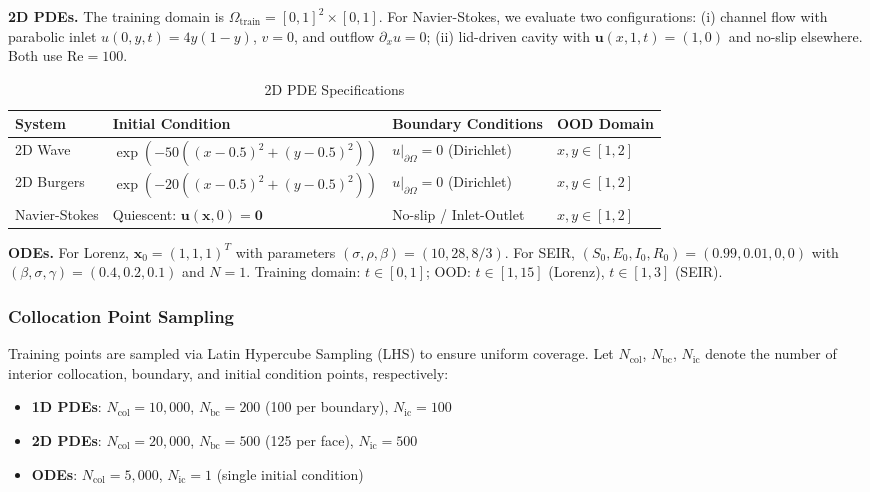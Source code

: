 \documentclass{article}
\theoremstyle{remark}
\begin{document}
\textbf{2D PDEs.} The training domain is $\Omega_{\text{train}} = [0,1]^2 \times [0,1]$. For Navier-Stokes, we evaluate two configurations: (i) channel flow with parabolic inlet $u(0,y,t) = 4y(1-y)$, $v=0$, and outflow $\partial_x u = 0$; (ii) lid-driven cavity with $\mathbf{u}(x,1,t) = (1,0)$ and no-slip elsewhere. Both use $\text{Re} = 100$.

\begin{table}[H]
\centering
\caption{2D PDE Specifications}
\label{tab:reproduction_2d}
\footnotesize
\begin{tabular}{llll}
\toprule
\textbf{System} & \textbf{Initial Condition} & \textbf{Boundary Conditions} & \textbf{OOD Domain} \\
\midrule
2D Wave & $\exp(-50((x-0.5)^2+(y-0.5)^2))$ & $u|_{\partial\Omega} = 0$ (Dirichlet) & $x,y \in [1,2]$ \\
2D Burgers & $\exp(-20((x-0.5)^2+(y-0.5)^2))$ & $u|_{\partial\Omega} = 0$ (Dirichlet) & $x,y \in [1,2]$ \\
Navier-Stokes & Quiescent: $\mathbf{u}(\mathbf{x},0) = \mathbf{0}$ & No-slip / Inlet-Outlet & $x,y \in [1,2]$ \\
\bottomrule
\end{tabular}
\end{table}

\textbf{ODEs.} For Lorenz, $\mathbf{x}_0 = (1, 1, 1)^T$ with parameters $(\sigma, \rho, \beta) = (10, 28, 8/3)$. For SEIR, $(S_0, E_0, I_0, R_0) = (0.99, 0.01, 0, 0)$ with $(\beta, \sigma, \gamma) = (0.4, 0.2, 0.1)$ and $N=1$. Training domain: $t \in [0,1]$; OOD: $t \in [1,15]$ (Lorenz), $t \in [1,3]$ (SEIR).

\subsubsection{Collocation Point Sampling}

Training points are sampled via Latin Hypercube Sampling (LHS) to ensure uniform coverage. Let $N_{\text{col}}$, $N_{\text{bc}}$, $N_{\text{ic}}$ denote the number of interior collocation, boundary, and initial condition points, respectively:
\begin{itemize}
\item \textbf{1D PDEs}: $N_{\text{col}} = 10{,}000$, $N_{\text{bc}} = 200$ (100 per boundary), $N_{\text{ic}} = 100$
\item \textbf{2D PDEs}: $N_{\text{col}} = 20{,}000$, $N_{\text{bc}} = 500$ (125 per face), $N_{\text{ic}} = 500$
\item \textbf{ODEs}: $N_{\text{col}} = 5{,}000$, $N_{\text{ic}} = 1$ (single initial condition)
\end{itemize}
\end{document}

